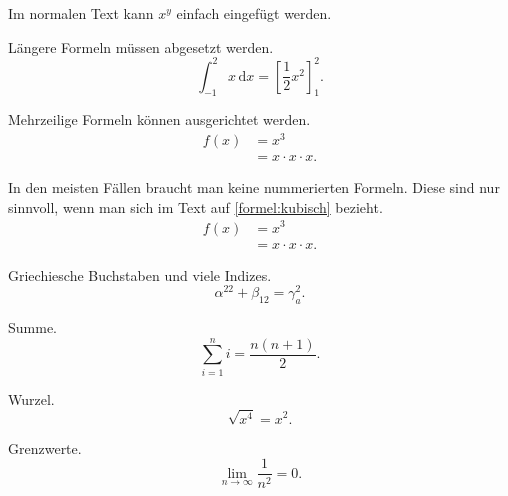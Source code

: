 \documentclass{scrartcl}
\begin{document}
  Im normalen Text kann $x^y$ einfach eingefügt werden.

  Längere Formeln müssen abgesetzt werden.
  \[ \int_{-1}^{2} x\,\mathrm{d}x = \left[
    \frac{1}{2}x^{2} \right]_{1}^{2}. \]

  Mehrzeilige Formeln können ausgerichtet werden.
  \begin{align}
    f(x) &= x^3 \label{formel:kubisch} \\
             &= x \cdot x \cdot x.
  \end{align}

  In den meisten Fällen braucht man keine nummerierten Formeln. Diese sind nur sinnvoll,
  wenn man sich im Text auf \autoref{formel:kubisch} bezieht.
  \begin{align*}
    f(x) &= x^3 \\
             &= x \cdot x \cdot x.
  \end{align*}

  Griechiesche Buchstaben und viele Indizes.
  \[ \alpha^{22} + \beta_{12} = \gamma^2_a. \]

  Summe.
  \[ \sum_{i=1}^n i = \frac{n(n+1)}{2}. \]

  Wurzel.
  \[ \sqrt{x^4} = x^2. \]

  Grenzwerte.
  \[ \lim_{n\to\infty} \frac{1}{n^2} = 0. \]
\end{document}

